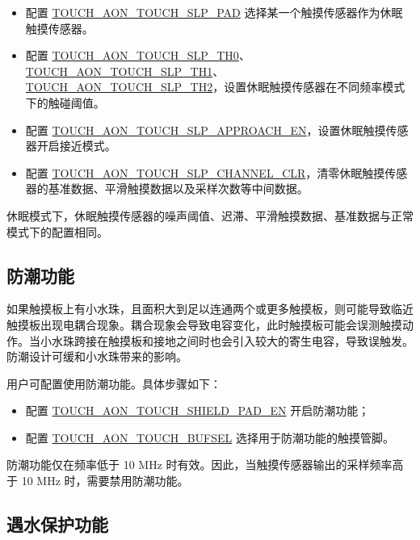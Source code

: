 \documentclass[main\_\_CN.tex]{subfiles}
\begin{document}
\begin{itemize}
    \item 配置 \hyperref[fielddesc:TOUCHAONTOUCHSLPPAD]{TOUCH\_AON\_TOUCH\_SLP\_PAD} 选择某一个触摸传感器作为休眠触摸传感器。
    \item 配置 \hyperref[fielddesc:TOUCHAONTOUCHSLPTH0]{TOUCH\_AON\_TOUCH\_SLP\_TH0}、\hyperref[fielddesc:TOUCHAONTOUCHSLPTH0]{TOUCH\_AON\_TOUCH\_SLP\_TH1}、\hyperref[fielddesc:TOUCHAONTOUCHSLPTH0]{TOUCH\_AON\_TOUCH\_SLP\_TH2}，设置休眠触摸传感器在不同频率模式下的触碰阈值。
    \item 配置 \hyperref[fielddesc:TOUCHAONTOUCHSLPAPPROACHEN]{TOUCH\_AON\_TOUCH\_SLP\_APPROACH\_EN}，设置休眠触摸传感器开启接近模式。
    \item 配置 \hyperref[fielddesc:TOUCHAONTOUCHSLPCHANNELCLR]{TOUCH\_AON\_TOUCH\_SLP\_CHANNEL\_CLR}，清零休眠触摸传感器的基准数据、平滑触摸数据以及采样次数等中间数据。
\end{itemize}

\begin{tiplisting}
休眠模式下，休眠触摸传感器的噪声阈值、迟滞、平滑触摸数据、基准数据与正常模式下的配置相同。
\end{tiplisting}

\subsection{防潮功能}

如果触摸板上有小水珠，且面积大到足以连通两个或更多触摸板，则可能导致临近触摸板出现电耦合现象。耦合现象会导致电容变化，此时触摸板可能会误测触摸动作。当小水珠跨接在触摸板和接地之间时也会引入较大的寄生电容，导致误触发。防潮设计可缓和小水珠带来的影响。

用户可配置使用防潮功能。具体步骤如下：

\begin{itemize}
    \item 配置 \hyperref[fielddesc:TOUCHAONTOUCHSHIELDPADEN]{TOUCH\_AON\_TOUCH\_SHIELD\_PAD\_EN} 开启防潮功能；
    \item 配置 \hyperref[fielddesc:TOUCHAONTOUCHBUFSEL]{TOUCH\_AON\_TOUCH\_BUFSEL} 选择用于防潮功能的触摸管脚。
\end{itemize}

\begin{tiplisting}
防潮功能仅在频率低于 10 MHz 时有效。因此，当触摸传感器输出的采样频率高于 10 MHz 时，需要禁用防潮功能。
\end{tiplisting}
\subsection{遇水保护功能}
\label{sec:tchsen-water-reject}
\end{document}

